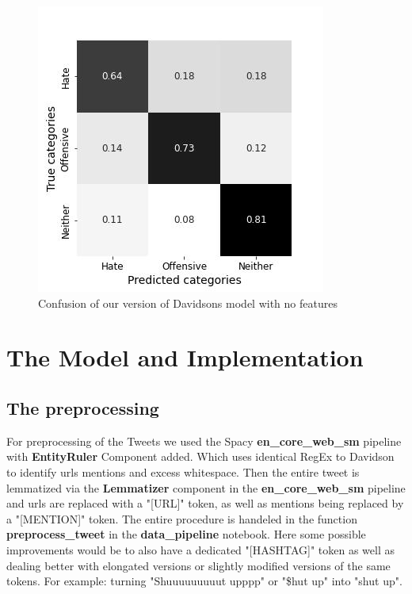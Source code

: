 \documentclass[11pt,a4paper]{article}
\begin{document}
\begin{figure}[h]
  \includegraphics[width=\linewidth]{nofeat_confusion.jpg}
  \caption{Confusion of our version of Davidsons model with no features}
  \label{fig:nofeature_confusion}
\end{figure}

\section{The Model and Implementation}

\subsection{The preprocessing}
For preprocessing of the Tweets we used the Spacy \textbf{en\_core\_web\_sm} pipeline with \textbf{EntityRuler} Component added.
Which uses identical RegEx to Davidson to identify urls mentions and excess whitespace.
Then the entire tweet is lemmatized via the \textbf{Lemmatizer} component in the \textbf{en\_core\_web\_sm} pipeline and urls 
are replaced with a "[URL]" token, as well as mentions being replaced by a "[MENTION]" token.
The entire procedure is handeled in the function \textbf{preprocess\_tweet} in the \textbf{data\_pipeline} notebook.
Here some possible improvements would be to also have a dedicated "[HASHTAG]" token as well as dealing better with elongated
versions or slightly modified versions of the same tokens. 
For example: turning "Shuuuuuuuuut upppp" or "\$hut up" into "shut up".
\end{document}
